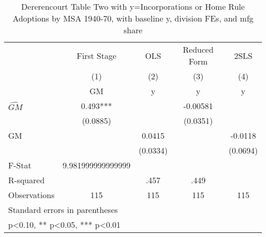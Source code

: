 \begin{table}[htbp]\centering
\def\sym#1{\ifmmode^{#1}\else\(^{#1}\)\fi}
\caption{Dererencourt Table Two with y=Incorporations or Home Rule Adoptions by MSA 1940-70, with baseline y, division FEs, and mfg share}
\begin{tabular}{l*{4}{c}}
\toprule
                    & First Stage   &         OLS   &Reduced Form   &        2SLS   \\
                    &\multicolumn{1}{c}{(1)}&\multicolumn{1}{c}{(2)}&\multicolumn{1}{c}{(3)}&\multicolumn{1}{c}{(4)}\\
                    &\multicolumn{1}{c}{GM}&\multicolumn{1}{c}{y}&\multicolumn{1}{c}{y}&\multicolumn{1}{c}{y}\\
\midrule
$\hat{GM}$          &       0.493***&               &    -0.00581   &               \\
                    &    (0.0885)   &               &    (0.0351)   &               \\
\addlinespace
GM                  &               &      0.0415   &               &     -0.0118   \\
                    &               &    (0.0334)   &               &    (0.0694)   \\
\midrule
F-Stat              &9.981999999999999   &               &               &               \\
R-squared           &               &        .457   &        .449   &               \\
Observations        &         115   &         115   &         115   &         115   \\
\bottomrule
\multicolumn{5}{l}{\footnotesize Standard errors in parentheses}\\
\multicolumn{5}{l}{\footnotesize * p<0.10, ** p<0.05, *** p<0.01}\\
\end{tabular}
\end{table}
